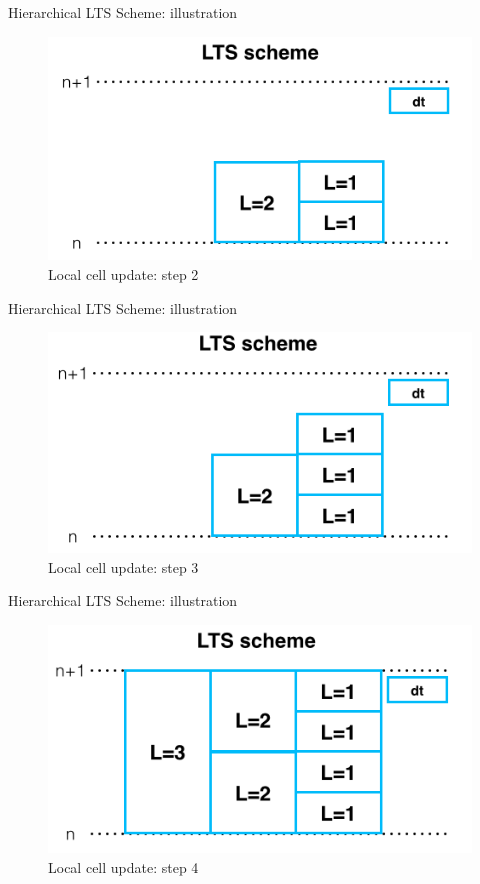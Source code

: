 \documentclass{beamer}
\begin{document}
\begin{frame}{Hierarchical LTS Scheme: illustration}
\begin{figure}[p]
    \centering
    \includegraphics[width=1\textwidth]{LTS_T2}
    \caption{Local cell update: step 2}
    \label{fig:awe}
\end{figure}
\end{frame}
\begin{frame}{Hierarchical LTS Scheme: illustration}
\begin{figure}[p]
    \centering
    \includegraphics[width=1\textwidth]{LTS_T3}
    \caption{Local cell update: step 3}
    \label{fig:awesome_img}
\end{figure}
\end{frame}
\begin{frame}{Hierarchical LTS Scheme: illustration}
\begin{figure}[p]
    \centering
    \includegraphics[width=1\textwidth]{LTS_T4}
    \caption{Local cell update: step 4}
    \label{fig:awesome}
\end{figure}
\end{frame}
\end{document}
